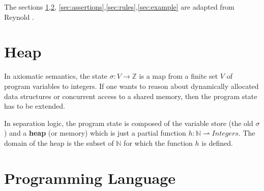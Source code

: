 \documentclass[12pt]{article}
\begin{document}
The sections \ref{sec:heap},\ref{sec:language}, \ref{sec:assertions},\ref{sec:rules},\ref{sec:example} are adapted from Reynold \cite{reynolds}.

\section{Heap} \label{sec:heap}

In axiomatic semantics, the state $\sigma : V \to \mathbb{Z}$ is a map from a finite set $V$ of program variables to integers. If one wants to reason about dynamically allocated data structures or concurrent access to a shared memory, then the program state has to be extended. 

In separation logic, the program state is composed of the variable store (the old $\sigma$) and a \textbf{heap} (or memory) which is just a partial function $h:\mathbb{N} \rightharpoonup Integers$. The domain of the heap is the subset of $\mathbb{N}$ for which the function $h$ is defined.

\section{Programming Language} \label{sec:language}
\end{document}
